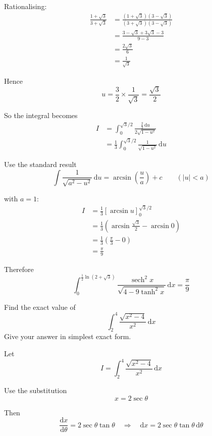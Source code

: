 \documentclass[leqno]{article}
\begin{document}
\begin{enumerate}[
  label=\textbf{\arabic*.},
  leftmargin=*,
  topsep=0pt,
  partopsep=0pt,
  parsep=0pt
]
\begin{djsSolution}
Rationalising:
\begin{align*}
\frac{1+\sqrt{3}}{3+\sqrt{3}}
&=\frac{(1+\sqrt{3})(3-\sqrt{3})}{(3+\sqrt{3})(3-\sqrt{3})} \\
&=\frac{3-\sqrt{3}+3\sqrt{3}-3}{9-3} \\
&=\frac{2\sqrt{3}}{6} \\
&=\frac{1}{\sqrt{3}}
\end{align*}

Hence
\[
u=\frac{3}{2}\times\frac{1}{\sqrt{3}}=\frac{\sqrt{3}}{2}
\]

So the integral becomes
\begin{align*}
I
&=\int_0^{\sqrt{3}/2} \frac{\frac{2}{3}\,\mathrm{d}u}{2\sqrt{1-u^2}} \\
&=\frac{1}{3}\int_0^{\sqrt{3}/2}\frac{1}{\sqrt{1-u^2}}\,\mathrm{d}u
\end{align*}

Use the standard result
\[
\int \frac{1}{\sqrt{a^2-u^2}}\,\mathrm{d}u=\arcsin\left(\frac{u}{a}\right)+c\qquad (|u|<a)
\]

with \(a=1\):
\begin{align*}
I
&=\frac{1}{3}\left[\arcsin u\right]_0^{\sqrt{3}/2} \\
&=\frac{1}{3}\left(\arcsin\frac{\sqrt{3}}{2}-\arcsin 0\right) \\
&=\frac{1}{3}\left(\frac{\pi}{3}-0\right) \\
&=\frac{\pi}{9}
\end{align*}

Therefore
\[
\int_0^{\frac{1}{2}\ln(2+\sqrt{3})} \frac{\operatorname{sech}^2 x}{\sqrt{4 - 9\tanh^2 x}}\,\mathrm{d}x=\frac{\pi}{9}
\]
\end{djsSolution}


\newpage

\questionitem

Find the exact value of
\[
\int_2^4 \frac{\sqrt{x^2-4}}{x^2} \, \mathrm{d}x
\]
Give your answer in simplest exact form. 

\vspace*{10pt}

\begin{djsSolution}
Let
\[
I=\int_2^4 \frac{\sqrt{x^2-4}}{x^2}\,\mathrm{d}x
\]

Use the substitution
\[
x=2\sec\theta
\]

Then
\[
\frac{\mathrm{d}x}{\mathrm{d}\theta}=2\sec\theta\tan\theta
\quad\Longrightarrow\quad
\mathrm{d}x=2\sec\theta\tan\theta\,\mathrm{d}\theta
\]


\end{djsSolution}
\end{enumerate}
\end{document}
